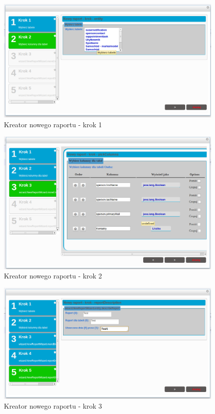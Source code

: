 	\begin{figure}[H]
		\centering
		\includegraphics[width=1.0\textwidth]{images/rbuilder_step1}
		\caption[Kreator nowego raportu - krok 1]{
			Kreator nowego raportu - krok 1
		}
		\label{app:wizard_newReport_step1}
	\end{figure}	
	\begin{figure}[H]
		\centering
		\includegraphics[width=1.0\textwidth]{images/rbuilder_step2}
		\caption[Kreator nowego raportu - krok 2]{
			Kreator nowego raportu - krok 2
		}
		\label{app:wizard_newReport_step2}
	\end{figure}		
	\begin{figure}[H]
		\centering
		\includegraphics[width=1.0\textwidth]{images/rbuilder_step3}
		\caption[Kreator nowego raportu - krok 3]{
			Kreator nowego raportu - krok 3
		}
		\label{app:wizard_newReport_step2}
	\end{figure}	
	
